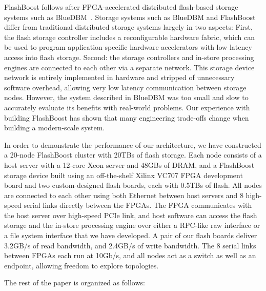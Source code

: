FlashBoost follows after FPGA-accelerated distributed flash-based storage
systems such as BlueDBM~\cite{bluedbm}. Storage systems such as BlueDBM and
FlashBoost differ from traditional distributed storage systems largely in two
aspects: First, the flash storage controller includes a reconfigurable hardware
fabric, which can be used to program application-specific hardware accelerators
with low latency access into flash storage. Second: the storage
controllers and in-store processing engines are connected to each other via a separate network.
This storage device network is entirely implemented in hardware and stripped of
unnecessary software overhead, allowing very low latency communication between
storage nodes. However, the system described in BlueDBM was too small and slow
to accurately evaluate its benefits with real-world problems. Our experience
with building FlashBoost has shown that many engineering trade-offs change when
building a modern-scale system.


In order to demonstrate the performance of our architecture, we have constructed
a 20-node FlashBoost cluster with 20TBs of flash storage. Each node consists of
a host server with a 12-core Xeon server and 48GBs of DRAM, and a FlashBoost
storage device built using an off-the-shelf Xilinx VC707 FPGA development board
and two custom-designed flash boards, each with 0.5TBs of flash. All nodes are
connected to each other using both Ethernet between host servers and 8
high-speed serial links directly between the FPGAs. The FPGA communicates with
the host server over high-speed PCIe link, and host software can access the
flash storage and the in-store processing engine over either a RPC-like raw
interface or a file system interface that we have developed. A pair of our flash
boards deliver 3.2GB/s of read bandwidth, and 2.4GB/s of write bandwidth.  The 8
serial links between FPGAs each run at 10Gb/s, and all nodes act as a switch as
well as an endpoint, allowing freedom to explore topologies.

The rest of the paper is organized as follows:



